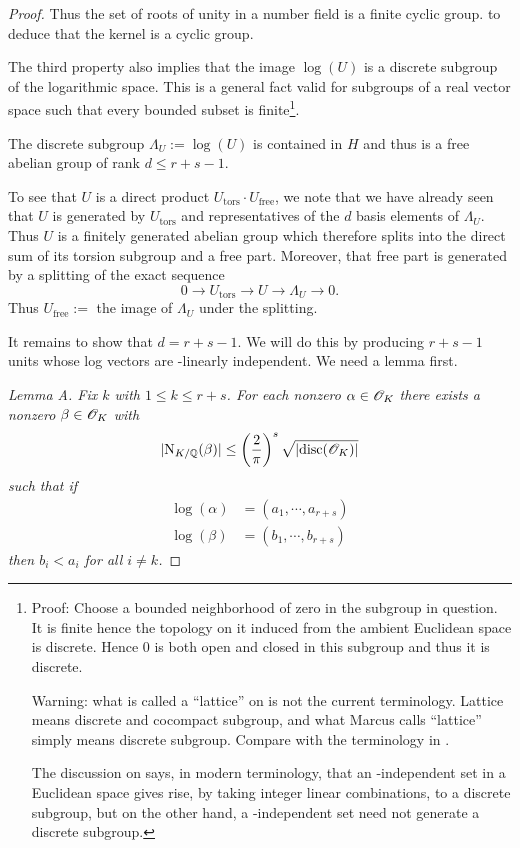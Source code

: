 \documentclass[10pt,a4paper,reqno]{amsart}
\begin{document}
\begin{proof}
{Thus the set of roots of unity in a number field is a finite cyclic group.} to
deduce that the kernel is a cyclic group.

The third property also implies that the image $\log(U)$ is a discrete subgroup
of the logarithmic space. This is a general fact valid for subgroups of a real
vector space such that every bounded subset is finite\footnote{Proof: Choose a
bounded neighborhood of zero in the subgroup in question. It is finite hence
the topology on it induced from the ambient Euclidean space is discrete.
Hence 0 is both open and closed in this subgroup and thus it is discrete.

Warning: what is called a ``lattice'' on \cite[p.143]{M} is not the current
terminology. Lattice means discrete and cocompact subgroup, and what Marcus
calls ``lattice'' simply means discrete subgroup. Compare with the terminology
in \cite{MilneANT}.

The discussion on \cite[p.143]{M} says, in modern terminology, that an
\R-independent set in a Euclidean space gives rise, by taking integer linear
combinations, to a discrete subgroup, but on the other hand, a \Z-independent
set need not generate a discrete subgroup.}.

The discrete subgroup $\Lambda_U := \log(U)$ is contained in $H$ and thus is a
free abelian group of rank $d \le r+s-1.$

To see that $U$ is a direct product $U_{\mathrm{tors}}\cdot U_{\mathrm{free}}$,
we note that we have already seen that $U$ is generated by $U_{\mathrm{tors}}$
and representatives of the $d$ basis elements of $\Lambda_U$. Thus $U$ is a
finitely generated abelian group which therefore splits into the direct sum of
its torsion subgroup and a free part. Moreover, that free part is generated by
a splitting of the exact sequence \[0\rightarrow U_{\mathrm{tors}} \rightarrow
U \rightarrow \Lambda_U \rightarrow 0.\] Thus $U_{\mathrm{free}} := $ the
image of $\Lambda_U$ under the splitting.

It remains to show that $d=r+s-1$. We will do this by producing $r+s-1$ units
whose log vectors are \R-linearly independent. We need a lemma first.

\textsl{Lemma A. Fix $k$ with $1 \le k \le r+s$. For each nonzero
$\alpha\in \mathscr{O}_K$ there exists a nonzero $\beta\in \mathscr{O}_K$ with
\[|\mathrm{N}_{K/\mathbb{Q}}(\beta)| \le \left( \frac{2}{\pi} \right)^s
\sqrt{|\mathrm{disc}(\mathscr{O}_K)|}\] such that if \begin{align*} \log(\alpha) &=
(a_1,\cdots,a_{r+s})\\ \log(\beta) &= (b_1,\cdots,b_{r+s})
\end{align*} then $b_i < a_i$ for all $i \neq k$.}


\end{proof}
\end{document}

